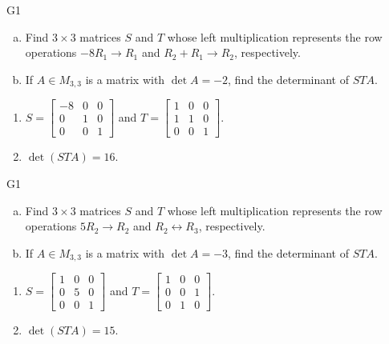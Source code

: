 \begin{problem}{G1}
\begin{enumerate}[(a)]
\item Find \(3 \times 3\) matrices \(S\) and \(T\) whose left multiplication represents the row operations \(-8R_1\to R_1\) and \(R_2+R_1 \to R_2\), respectively.
\item If \(A \in M_{3,3}\) is a matrix with \(\det A = -2\), find the determinant of \(STA\). 
\end{enumerate}
\end{problem}
\begin{solution}
\begin{enumerate}
\item 
\(S= \begin{bmatrix} -8 & 0 & 0 \\ 0 & 1 & 0 \\ 0 & 0 & 1 \end{bmatrix}\) and
\(T= \begin{bmatrix} 1 & 0 & 0 \\ 1 & 1 & 0 \\ 0 & 0 & 1 \end{bmatrix}\).
\item \(\det(STA)=16\).
\end{enumerate}
\end{solution}

\begin{problem}{G1}
\begin{enumerate}[(a)]
\item Find \(3 \times 3\) matrices \(S\) and \(T\) whose left multiplication represents the row operations \(5R_2\to R_2\) and \(R_2 \leftrightarrow R_3\), respectively.
\item If \(A \in M_{3,3}\) is a matrix with \(\det A = -3\), find the determinant of \(STA\). 
\end{enumerate}
\end{problem}
\begin{solution}
\begin{enumerate}
\item 
\(S= \begin{bmatrix} 1 & 0 & 0 \\ 0 & 5 & 0 \\ 0 & 0 & 1 \end{bmatrix}\) and
\(T= \begin{bmatrix} 1 & 0 & 0 \\ 0 & 0 & 1 \\ 0 & 1 & 0 \end{bmatrix}\).
\item \(\det(STA)=15\).
\end{enumerate}
\end{solution}

